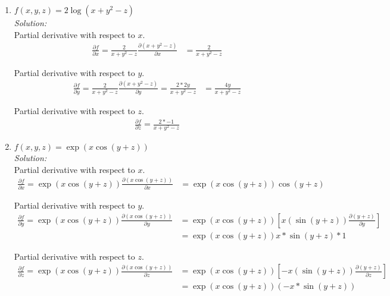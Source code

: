 \documentclass{../amsml}
\begin{document}
\begin{problem}
\begin{enumerate}
	\item $f(x,y,z) =  2\log(x+y^2-z)$ \\
		\emph{Solution: }  \\
			Partial derivative with respect to $x$. \\
			\begin{align}
				\frac{\partial f}{\partial x} = \frac{2}{x+y^2-z}  \frac{\partial(x+y^2-z)}{\partial x} &=  \frac{2}{x+y^2-z}
			\end{align}
			
			Partial derivative with respect to $y$. \\
			\begin{align}
				\frac{\partial f}{\partial y} = \frac{2}{x+y^2-z}  \frac{\partial(x+y^2-z)}{\partial y} =  \frac{2*2y}{x+y^2-z}
				&= \frac{4y}{x + y^2 - z}
			\end{align}
			
			Partial derivative with respect to $z$.\\
			\begin{align}
				\frac{\partial f}{\partial z } = \frac{2 * -1}{x + y^2 - z}
			\end{align}
			
	\item $f(x,y,z) = \exp(x\cos(y+z))$ \\
		\emph{Solution: }  \\
			Partial derivative with respect to $x$. \\
			\begin{align}
				\frac{\partial f}{\partial x} = \exp(x\cos(y+z)) \frac{\partial(x \cos(y + z))}{\partial x}&=  \exp(x\cos(y+z)) \cos(y+z)
			\end{align}
			
			Partial derivative with respect to $y$. \\
			\begin{align}
				\frac{\partial f}{\partial y} = \exp(x\cos(y+z)) \frac{\partial(x \cos(y + z))}{\partial y}&=  \exp(x\cos(y+z)) [x(\sin(y + z))\frac{\partial (y+z)}{\partial y}] \\
				&= \exp(x\cos(y+z)) x * \sin(y+z)*1
			\end{align}
			
			Partial derivative with respect to $z$. \\
			\begin{align}
				\frac{\partial f}{\partial z} = \exp(x\cos(y+z)) \frac{\partial(x \cos(y + z))}{\partial z}&=  \exp(x\cos(y+z)) [-x(\sin(y + z))\frac{\partial (y+z)}{\partial z}] \\
				&= \exp(x\cos(y+z)) (-x * \sin(y+z))
			\end{align}
		
\end{enumerate}
\end{problem}
\end{document}
